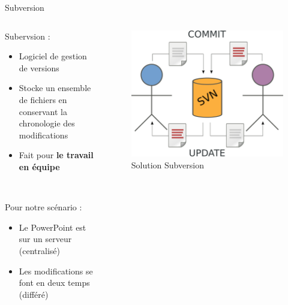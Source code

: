 \begin{frame}{Subversion}
\begin{columns}
  \begin{column}{.5\textwidth}
  Subervsion :
  \begin{itemize}
    \item Logiciel de gestion de versions
    \item Stocke un ensemble de fichiers en conservant la chronologie des
    modifications
    \item Fait pour \textbf{le travail en équipe}
  \end{itemize}~

  Pour notre scénario :
  \begin{itemize}
    \item Le PowerPoint est sur un serveur (centralisé)
    \item Les modifications se font en deux temps (différé)
  \end{itemize}
  \end{column}

  \begin{column}{.45\textwidth}
  \begin{figure}
    \center
    \includegraphics[width=.9\textwidth]{includes/svn.pdf}
    \caption{Solution Subversion}
  \end{figure}
  \end{column}
\end{columns}
\end{frame}


